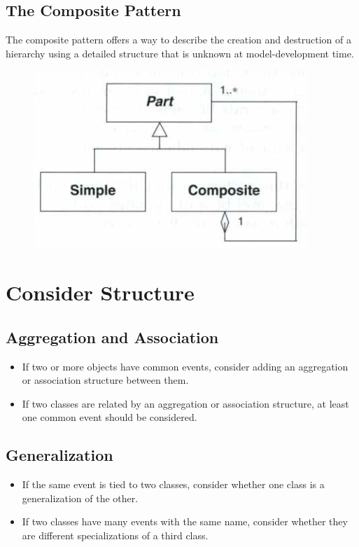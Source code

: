 \subsection*{The Composite Pattern \ooad[107]}
The composite pattern offers a way to describe the creation and destruction of a hierarchy using a detailed structure that is unknown at model-development time. 
\begin{figure}[H]
    \centering
    \includegraphics[width=\linewidth/2]{chapters/behavior/figures/composite_pattern.png}
\end{figure}

\section{Consider Structure}
\subsection*{Aggregation and Association\ooad[108]}
\begin{itemize}
    \item If two or more objects have common events, consider adding an aggregation or association structure between them.
    \item If two classes are related by an aggregation or association structure, at least one common event should be considered.
\end{itemize}

\subsection*{Generalization \ooad[109]}
\begin{itemize}
    \item If the same event is tied to two classes, consider whether one class is a generalization of the other.
    \item If two classes have many events with the same name, consider whether they are different specializations of a third class.
\end{itemize}